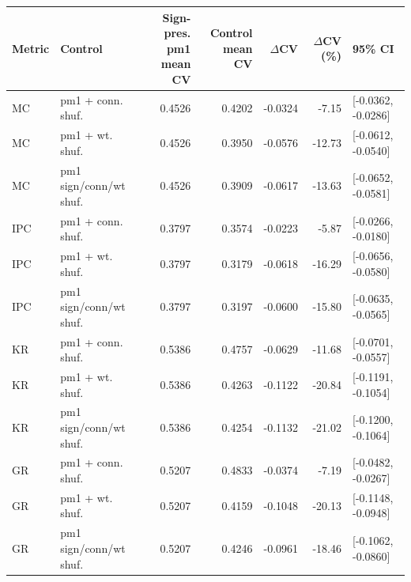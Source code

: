 \begin{tabular}{llrrrrl}
\toprule
Metric & Control & Sign-pres. pm1 mean CV & Control mean CV & $\Delta$CV & $\Delta$CV (\%) & 95\% CI \\
\midrule
MC & pm1 + conn. shuf. & 0.4526 & 0.4202 & -0.0324 & -7.15 & [-0.0362, -0.0286] \\
MC & pm1 + wt. shuf. & 0.4526 & 0.3950 & -0.0576 & -12.73 & [-0.0612, -0.0540] \\
MC & pm1 sign/conn/wt shuf. & 0.4526 & 0.3909 & -0.0617 & -13.63 & [-0.0652, -0.0581] \\
IPC & pm1 + conn. shuf. & 0.3797 & 0.3574 & -0.0223 & -5.87 & [-0.0266, -0.0180] \\
IPC & pm1 + wt. shuf. & 0.3797 & 0.3179 & -0.0618 & -16.29 & [-0.0656, -0.0580] \\
IPC & pm1 sign/conn/wt shuf. & 0.3797 & 0.3197 & -0.0600 & -15.80 & [-0.0635, -0.0565] \\
KR & pm1 + conn. shuf. & 0.5386 & 0.4757 & -0.0629 & -11.68 & [-0.0701, -0.0557] \\
KR & pm1 + wt. shuf. & 0.5386 & 0.4263 & -0.1122 & -20.84 & [-0.1191, -0.1054] \\
KR & pm1 sign/conn/wt shuf. & 0.5386 & 0.4254 & -0.1132 & -21.02 & [-0.1200, -0.1064] \\
GR & pm1 + conn. shuf. & 0.5207 & 0.4833 & -0.0374 & -7.19 & [-0.0482, -0.0267] \\
GR & pm1 + wt. shuf. & 0.5207 & 0.4159 & -0.1048 & -20.13 & [-0.1148, -0.0948] \\
GR & pm1 sign/conn/wt shuf. & 0.5207 & 0.4246 & -0.0961 & -18.46 & [-0.1062, -0.0860] \\
\bottomrule
\end{tabular}
